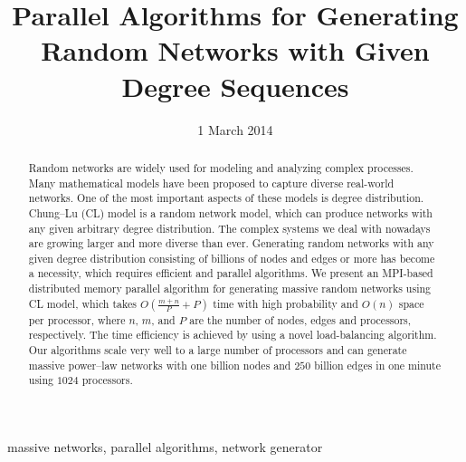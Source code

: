 \documentclass[conference,letterpaper,10pt]{IEEEtran}
\begin{document}
\title{Parallel Algorithms for Generating Random Networks with Given Degree Sequences}

\author{
}

\date{1 March 2014}

\maketitle

\begin{abstract}
Random networks are widely used for modeling and analyzing complex processes. 
Many mathematical models have been proposed to capture diverse real-world networks. 
One of the most important aspects of these models is degree distribution. 
Chung--Lu (CL) model is a random network model, which can produce networks with any given arbitrary degree distribution. 
The complex systems we deal with nowadays are growing larger and more diverse than ever.
Generating random networks with any given degree distribution consisting of billions of nodes and edges or more has become a necessity, which requires efficient and parallel algorithms. 
We present an MPI-based distributed memory parallel algorithm for generating massive random networks using CL model, which takes $O(\frac{m+n}{P}+P)$ time with high probability and $O(n)$ space per processor, where $n$, $m$, and $P$ are the number of nodes, edges and processors, respectively. The time efficiency is achieved by using a novel load-balancing algorithm. Our algorithms scale very well to a large number of processors and can generate massive power--law networks with one billion nodes and $250$ billion edges in one minute using $1024$ processors.
\end{abstract}

\begin{IEEEkeywords}
massive networks, parallel algorithms, network generator
\end{IEEEkeywords}
\end{document}
